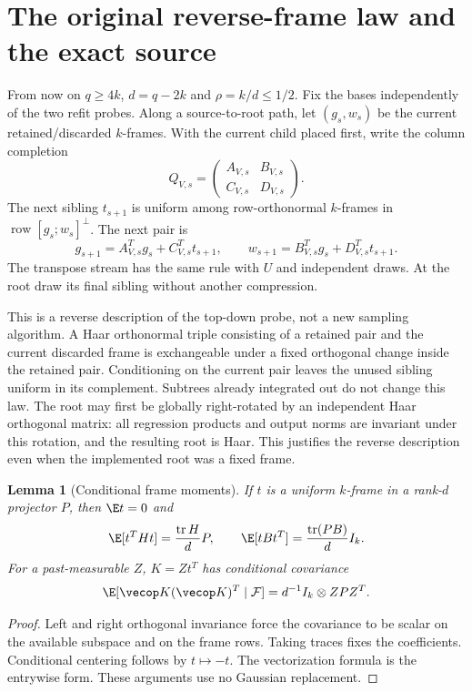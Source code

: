 \documentclass[11pt,oneside,openany,a4paper]{book}
\numberwithin{equation}{chapter}
\newtheorem{lemma}[theorem]{Lemma}
\theoremstyle{definition}
\theoremstyle{remark}
\DeclareMathOperator{\tr}{tr}\DeclareMathOperator{\rank}{rank}
\begin{document}
\section{The original reverse-frame law and the exact source}\label{base:new:source}
From now on $q\ge4k$, $d=q-2k$ and $\rho=k/d\le1/2$. Fix the bases independently of the two refit probes. Along a source-to-root path, let $(g_s,w_s)$ be the current retained/discarded $k$-frames. With the current child placed first, write the column completion
\[
 Q_{V,s}=\begin{pmatrix}A_{V,s}&B_{V,s}\\C_{V,s}&D_{V,s}\end{pmatrix}.
\]
The next sibling $t_{s+1}$ is uniform among row-orthonormal $k$-frames in
$\operatorname{row}[g_s;w_s]^\perp$. The next pair is
\begin{equation}\label{base:new:reverse}
 g_{s+1}=A_{V,s}^Tg_s+C_{V,s}^Tt_{s+1},\qquad
 w_{s+1}=B_{V,s}^Tg_s+D_{V,s}^Tt_{s+1}.
\end{equation}
The transpose stream has the same rule with $U$ and independent draws. At the root draw its final sibling without another compression.

This is a reverse description of the top-down probe, not a new sampling algorithm. A Haar orthonormal triple consisting of a retained pair and the current discarded frame is exchangeable under a fixed orthogonal change inside the retained pair. Conditioning on the current pair leaves the unused sibling uniform in its complement. Subtrees already integrated out do not change this law. The root may first be globally right-rotated by an independent Haar orthogonal matrix: all regression products and output norms are invariant under this rotation, and the resulting root is Haar. This justifies the reverse description even when the implemented root was a fixed frame.

\begin{lemma}[Conditional frame moments]\label{base:new:frame-mom}
If $t$ is a uniform $k$-frame in a rank-$d$ projector $P$, then $\E t=0$ and
\[
 \E[t^THt]=\frac{\tr H}{d}P,\qquad
 \E[tBt^T]=\frac{\tr(PB)}d I_k.
\]
For a past-measurable $Z$, $K=Zt^T$ has conditional covariance
\[
 \E[\vecop K(\vecop K)^T\mid\mathcal F]=d^{-1}I_k\otimes ZPZ^T.
\]
\end{lemma}
\begin{proof}
Left and right orthogonal invariance force the covariance to be scalar on the available subspace and on the frame rows. Taking traces fixes the coefficients. Conditional centering follows by $t\mapsto-t$. The vectorization formula is the entrywise form. These arguments use no Gaussian replacement.
\end{proof}
\end{document}
